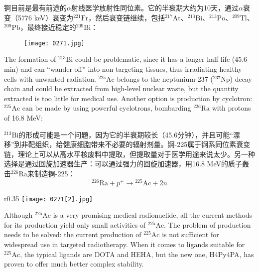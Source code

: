 \documentclass[dvipsnames, svgnames,a4paper,11pt]{article}
\begin{document}
锕目前是最有前途的$\alpha$射线医学放射性同位素。它的半衰期大约为10天，通过$\alpha$衰变（5776 keV）衰变为\(\mathrm{^{221}Fr}\)，然后衰变链继续，包括\(\mathrm{^{217}At}\)、\(\mathrm{^{213}Bi}\)、\(\mathrm{^{213}Po}\)、\(\mathrm{^{209}Tl}\)、\(\mathrm{^{209}Pb}\)，最终接近稳定的\(\mathrm{^{209}Bi}\)：  

\begin{figure}[h]
	\centering
    \texttt{[image: 0271.jpg]}  
     \label{fig366}
\end{figure}


The formation of \(\mathrm{^{213}Bi}\) could be problematic, since it has a longer half-life (45.6 min) and can “wander off” into non-targeting tissues, thus irradiating healthy cells with unwanted radiation. \(\mathrm{^{225}Ac}\) belongs to the neptunium-237 (\(\mathrm{^{237}Np}\)) decay chain and could be extracted from high-level nuclear waste, but the quantity extracted is too little for medical use. Another option is production by cyclotron: \(\mathrm{^{225}Ac}\) can be made by using powerful cyclotrons, bombarding \(\mathrm{^{226}Ra}\) with protons of 16.8 MeV:

\(\mathrm{^{213}Bi}\)的形成可能是一个问题，因为它的半衰期较长（45.6分钟），并且可能“漂移”到非靶组织，给健康细胞带来不必要的辐射剂量。锕-225属于锕系同位素衰变链，理论上可以从高水平核废料中提取，但提取量对于医学用途来说太少。另一种选择是通过回旋加速器生产：可以通过强力的回旋加速器，用16.8 MeV的质子轰击\(\mathrm{^{226}Ra}\)来制造锕-225：
\[
\mathrm{^{226}Ra} + p^+ \rightarrow \mathrm{^{225}Ac} + 2n
\]

\begin{wrapfigure}{r}{0.35\textwidth}
	\centering
    \texttt{[image: 0271[2].jpg]}  
     \label{fig367}
\end{wrapfigure}

Although \(\mathrm{^{225}Ac}\) is a very promising medical radionuclide, all the current methods for its production yield only small activities of \(\mathrm{^{225}Ac}\). The problem of production needs to be solved: the current production of \(\mathrm{^{225}Ac}\) is not sufficient for widespread use in targeted radiotherapy. When it comes to ligands suitable for \(\mathrm{^{225}Ac}\), the typical ligands are DOTA and HEHA, but the new one, H4Py4PA, has proven to offer much better complex stability.
\end{document}
